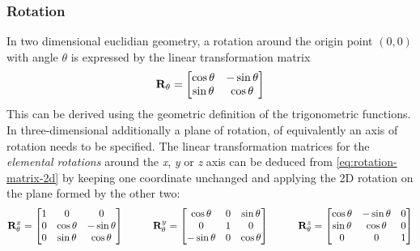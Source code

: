 \subsubsection{Rotation}
In two dimensional euclidian geometry, a rotation around the origin point $(0, 0)$ with angle $\theta$ is expressed by the linear transformation matrix
\begin{equation}
\mathbf{R}_{\theta} = \left[ \begin{matrix}
	\cos \theta & - \sin \theta \\
	\sin \theta & \cos \theta
\end{matrix} \right]
\label{eq:rotation-matrix-2d}
\end{equation}
This can be derived using the geometric definition of the trigonometric functions. In three-dimensional additionally a plane of rotation, of equivalently an axis of rotation needs to be specified. The linear transformation matrices for the \emph{elemental rotations} around the \emph{x}, \emph{y} or \emph{z} axis can be deduced from \ref{eq:rotation-matrix-2d} by keeping one coordinate unchanged and applying the 2D rotation on the plane formed by the other two:
\begin{equation}
\mathbf{R}_{\theta}^x = \left[ \begin{matrix}
	1 & 0 & 0 \\
	0 & \cos \theta & - \sin \theta \\
	0 & \sin \theta & \cos \theta
\end{matrix} \right]
\hspace{1cm}
\mathbf{R}_{\theta}^y = \left[ \begin{matrix}
	\cos \theta & 0 & \sin \theta \\
	0 & 1 & 0 \\
	- \sin \theta & 0 & \cos \theta
\end{matrix} \right]
\hspace{1cm}
\mathbf{R}_{\theta}^z = \left[ \begin{matrix}
	\cos \theta & - \sin \theta & 0 \\
	\sin \theta & \cos \theta & 0 \\
	0 & 0 & 1
\end{matrix} \right]
\end{equation}

